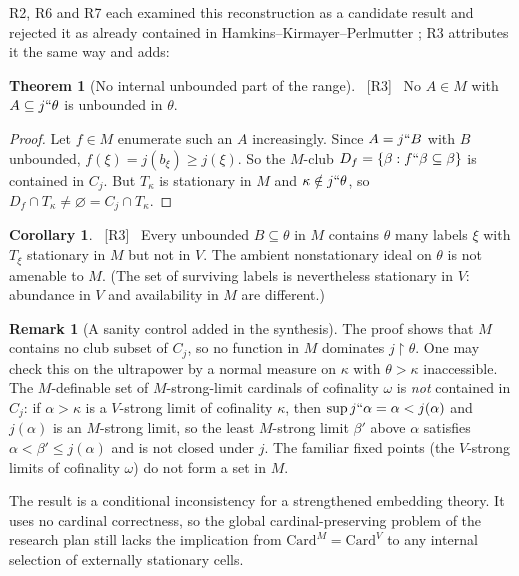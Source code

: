 \documentclass[11pt,letterpaper]{article}
\theoremstyle{definition}
\newtheorem{theorem}[definition]{Theorem}
\newtheorem{corollary}[definition]{Corollary}
\newtheorem{remark}[definition]{Remark}
\numberwithin{equation}{section}
\newcommand{\restr}{\mathbin{\upharpoonright}}
\newcommand{\src}[1]{\unskip\ {\normalfont\small\sffamily\color{Olive}[#1]}\ }
\newcommand{\R}[1]{\textsf{R#1}}
\begin{document}
\R2, \R6 and \R7 each examined this reconstruction as a candidate result and rejected it as already contained in Hamkins--Kirmayer--Perlmutter \cite[Thm.~11--12]{hkp}; \R3 attributes it the same way and adds:

\begin{theorem}[No internal unbounded part of the range]\label{thm:range}\src{R3}
No $A\in M$ with $A\subseteq j``\theta$ is unbounded in $\theta$.
\end{theorem}

\begin{proof}
Let $f\in M$ enumerate such an $A$ increasingly. Since $A=j``B$ with $B$ unbounded, $f(\xi)=j(b_\xi)\ge j(\xi)$. So the $M$-club $D_f=\{\beta:f``\beta\subseteq\beta\}$ is contained in $C_j$. But $T_\kappa$ is stationary in $M$ and $\kappa\notin j``\theta$, so $D_f\cap T_\kappa\ne\varnothing=C_j\cap T_\kappa$.
\end{proof}

\begin{corollary}\label{cor:losses}\src{R3}
Every unbounded $B\subseteq\theta$ in $M$ contains $\theta$ many labels $\xi$ with $T_\xi$ stationary in $M$ but not in $V$. The ambient nonstationary ideal on $\theta$ is not amenable to $M$. (The set of surviving labels is nevertheless stationary in $V$: abundance in $V$ and availability in $M$ are different.)
\end{corollary}

\begin{remark}[A sanity control added in the synthesis]
The proof shows that $M$ contains no club subset of $C_j$, so no function in $M$ dominates $j\restr\theta$. One may check this on the ultrapower by a normal measure on $\kappa$ with $\theta>\kappa$ inaccessible. The $M$-definable set of $M$-strong-limit cardinals of cofinality $\omega$ is \emph{not} contained in $C_j$: if $\alpha>\kappa$ is a $V$-strong limit of cofinality $\kappa$, then $\sup j``\alpha=\alpha<j(\alpha)$ and $j(\alpha)$ is an $M$-strong limit, so the least $M$-strong limit $\beta'$ above $\alpha$ satisfies $\alpha<\beta'\le j(\alpha)$ and is not closed under $j$. The familiar fixed points (the $V$-strong limits of cofinality $\omega$) do not form a set in $M$.
\end{remark}

The result is a conditional inconsistency for a strengthened embedding theory. It uses no cardinal correctness, so the global cardinal-preserving problem of the research plan still lacks the implication from $\mathrm{Card}^M=\mathrm{Card}^V$ to any internal selection of externally stationary cells.
\end{document}

